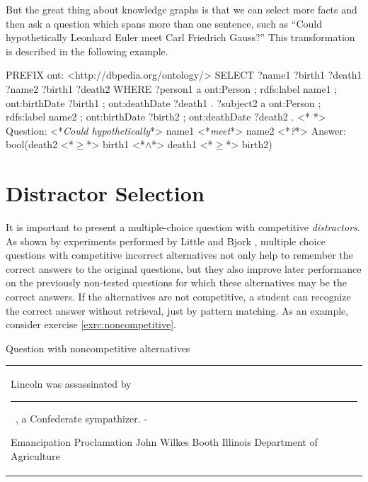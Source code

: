 \documentclass[12pt, twoside]{fithesis2}
\renewcommand{\_}{\leavevmode \kern0.07em\vbox{\hrule width0.4em}}
\newcommand{\arrowlinesplit}{%
  \noindent\makebox[\linewidth]{\raisebox{0.15em}{\rule{0.478\textwidth}{0.5pt}}%
  ~$\downarrow$~%
  \noindent\raisebox{0.15em}{\rule{0.478\textwidth}{0.5pt}}}%
}
\newcounter{choice}
\renewcommand\thechoice{\Alph{choice}}
\newcommand\choicelabel{\thechoice.}
\newenvironment{choices}%
  {\vspace{0.8em}\list{\choicelabel}%
     {\usecounter{choice}\def\makelabel##1{\hss\llap{##1}}%
       \settowidth{\leftmargin}{W.\hskip\labelsep\hskip 0.01em}%
       \def\choice{%
         \item
       } %
       \labelwidth\leftmargin\advance\labelwidth-\labelsep
       \topsep=0pt
       \partopsep=0pt
     }%
  }%
  {\vspace{-0.7em}\endlist}
\newenvironment{question}
{
  \begin{center}
  \vspace{-0.5em}
  \begin{tabular}{p{0.9\textwidth}}
}
{
  \\
  \end{tabular}
  \vspace{-1em}
  \end{center}
}
\newcommand{\sentenceGap}{\rule{1.5cm}{0.4pt}~}
\begin{document}
\noindent
But the great thing about knowledge graphs is that we can select more facts and then ask a question which spans more than one sentence, such as
``Could hypothetically Leonhard Euler meet Carl Friedrich Gauss?''
This transformation is described in the following example.
\begin{code}
PREFIX ont: <http://dbpedia.org/ontology/>
SELECT ?name1 ?birth1 ?death1 ?name2 ?birth1 ?death2
WHERE {
  ?person1 a ont:Person ;
      rdfs:label name1 ;
      ont:birthDate ?birth1 ;
      ont:deathDate ?death1 .
  ?subject2 a ont:Person ;
      rdfs:label name2 ;
      ont:birthDate ?birth2 ;
      ont:deathDate ?death2 .
}
<*\arrowlinesplit*>
Question: <*\emph{Could hypothetically}*> name1 <*\emph{meet}*> name2 <*\emph{?}*>
Answer: bool(death2 <*$\geq$*> birth1 <*$\land$*> death1 <*$\geq$*> birth2)
\end{code}


\section{Distractor Selection}
\label{sec:distractors}

It is important to present a multiple-choice question with competitive \textit{distractors}.
As shown by experiments performed by Little and Bjork \cite{optimizing-multiple-choice}, multiple choice questions with competitive incorrect alternatives not only help to remember the correct answers to the original questions, but they also improve later performance on the previously non-tested questions for which these alternatives may be the correct answers. If the alternatives are not competitive, a student can recognize the correct answer without retrieval, just by pattern matching.
As an example, consider exercise \ref{exrc:noncompetitive}.
\begin{exercise}
\caption{Question with noncompetitive alternatives}\label{exrc:noncompetitive}
  \begin{question}
  Lincoln was assassinated by \sentenceGap , a Confederate sympathizer.
  \begin{choices}
    \choice Emancipation Proclamation
    \choice John Wilkes Booth
    \choice Illinois
    \choice Department of Agriculture
  \end{choices}
  \end{question}
\end{exercise}
\end{document}
